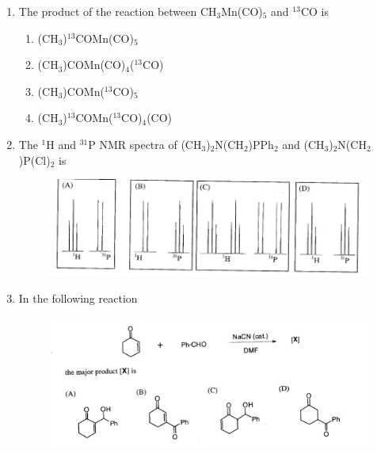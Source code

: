 \documentclass[journal,12pt,onecolumn]{IEEEtran}
\theoremstyle{remark}
\begin{document}
\begin{enumerate}
\item    \hspace{0.5cm} The product of the reaction between CH$_3$Mn(CO)$_5$ and $^{13}$CO is  \hfill{}

\begin{multicols}{2}
\begin{enumerate}
    \item (CH$_3$)$^{13}$COMn(CO)$_5$
    \item (CH$_3$)COMn(CO)$_4$($^{13}$CO)
    \item (CH$_3$)COMn($^{13}$CO)$_5$
    \item (CH$_3$)$^{13}$COMn($^{13}$CO)$_4$(CO)
\end{enumerate}
\end{multicols}
 

\item    \hspace{0.5cm} The $^1$H and $^{31}$P NMR spectra of (CH$_3$)$_2$N(CH$_2$)PPh$_2$ and (CH$_3$)$_2$N(CH$_2$)P(Cl)$_2$ is  \hfill{}

\begin{figure}[H][H]
    \centering
    \includegraphics[width=\linewidth]{figs/image5.jpg}
    \caption{}
    \label{fig:figure11}
\end{figure}
 

\item    \hspace{0.5cm} In the following reaction  \hfill{}

\begin{figure}[H][H]
    \centering
    \includegraphics[width=\textwidth]{figs/image6.jpg}
    \caption{}
    \label{fig:figure6}
\end{figure}



\end{enumerate}
\end{document}
